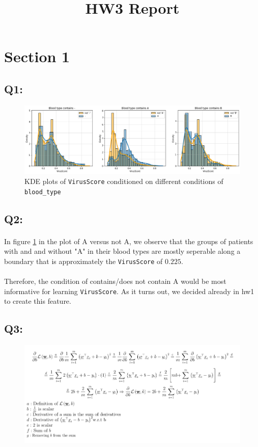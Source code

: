 \documentclass{article}
\title{HW3 Report}
\date{}
\newcommand{\code}[1]{\texttt{#1}}
\begin{document}
\maketitle
\section*{Section 1}
\subsection*{Q1:}
    \begin{figure}[H]
        \centering
        \includegraphics[scale=0.5]{images/q1.png}
        \caption{KDE plots of \code{VirusScore} conditioned on different conditions of \code{blood\_type}}
        \label{fig:q1}
    \end{figure}
\subsection*{Q2:}
    \paragraph*{}
    In figure \ref{fig:q1} in the plot of A versus not A, we observe that the groups of patients with and and without "A" in their blood types are mostly seperable along a boundary that is approximately the \code{VirusScore} of $0.225$. 
    \paragraph*{}
    Therefore, the condition of contains/does not contain A would be most informative for learning \code{VirusScore}.
    As it turns out, we decided already in hw1 to create this feature.
\subsection*{Q3:}
    \begin{figure}[H]
        \centering
        \includegraphics[scale=0.7]{images/q3.png}
    \end{figure}
\end{document}
